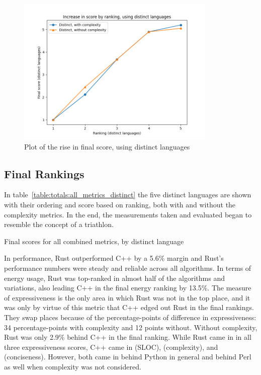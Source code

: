 \begin{figure}[h]
	\centering
	\includegraphics[width=0.85\textwidth]{figures/final_distinct.png}
	\caption{Plot of the rise in final score, using distinct languages}
	\label{fig:graph:final_distinct_plot}
\end{figure}

\subsection{Final Rankings}
\label{subsec:final-rankings}

In table~\ref{table:totals:all_metrics_distinct} the five distinct languages are shown with their ordering and score based on ranking, both with and without the complexity metrics. In the end, the measurements taken and evaluated began to resemble the concept of a triathlon.

\begin{table}[!htb]

\caption{Final scores for all combined metrics, by distinct language}
\label{table:totals:all_metrics_distinct}
\end{table}

In performance, Rust outperformed C++ by a 5.6\% margin and Rust's performance numbers were steady and reliable across all algorithms. In terms of energy usage, Rust was top-ranked in almost half of the algorithms and variations, also leading C++ in the final energy ranking by 13.5\%. The measure of expressiveness is the only area in which Rust was not in the top place, and it was only by virtue of this metric that C++ edged out Rust in the final rankings. They swap places because of the percentage-points of difference in expressiveness: 34 percentage-points with complexity and 12 points without. Without complexity, Rust was only 2.9\% behind C++ in the final ranking. While Rust came in  in all three expressiveness scores, C++ came in  (SLOC),  (complexity), and  (conciseness). However, both came in behind Python in general and behind Perl as well when complexity was not considered.

